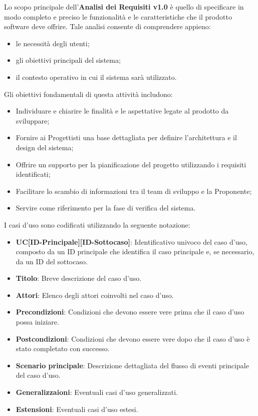 Lo scopo principale dell'\textbf{Analisi dei Requisiti v1.0} è quello di specificare in modo completo e preciso le funzionalità e le caratteristiche che il prodotto software deve offrire. Tale analisi consente di comprendere appieno:
\begin{itemize}
    \item le necessità degli utenti;
    \item gli obiettivi principali del sistema;
    \item il contesto operativo in cui il sistema sarà utilizzato.
\end{itemize}

Gli obiettivi fondamentali di questa attività includono:
\begin{itemize}
    \item Individuare e chiarire le finalità e le aspettative legate al prodotto da sviluppare;
    \item Fornire ai Progettisti una base dettagliata per definire l’architettura e il design del sistema;
    \item Offrire un supporto per la pianificazione del progetto utilizzando i requisiti identificati;
    \item Facilitare lo scambio di informazioni tra il team di sviluppo e la Proponente;
    \item Servire come riferimento per la fase di verifica del sistema.
\end{itemize}


I casi d'uso sono codificati utilizzando la seguente notazione:

\begin{itemize}
    \item \textbf{UC[ID-Principale][ID-Sottocaso]}: Identificativo univoco del caso d'uso, composto da un ID principale che identifica il caso principale e, se necessario, da un ID del sottocaso.
    \item \textbf{Titolo}: Breve descrizione del caso d'uso.
    \item \textbf{Attori}: Elenco degli attori coinvolti nel caso d'uso.
    \item \textbf{Precondizioni}: Condizioni che devono essere vere prima che il caso d'uso possa iniziare.
    \item \textbf{Postcondizioni}: Condizioni che devono essere vere dopo che il caso d'uso è stato completato con successo.
    \item \textbf{Scenario principale}: Descrizione dettagliata del flusso di eventi principale del caso d'uso.
    \item \textbf{Generalizzaioni}: Eventuali casi d'uso generalizzati.
    \item \textbf{Estensioni}: Eventuali casi d'uso estesi.
\end{itemize}

